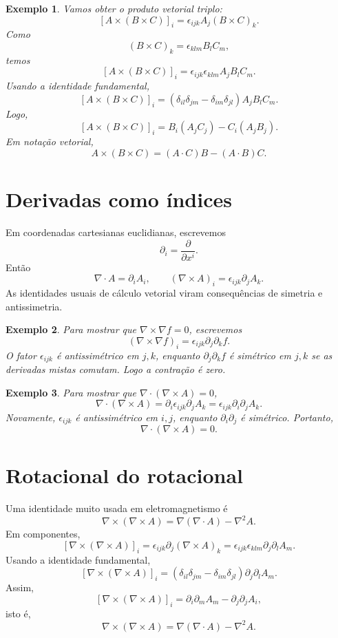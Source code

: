 \documentclass[12pt,a4paper,oneside]{book}
\theoremstyle{rgplain}
\newtheorem{example}{Exemplo}[chapter]
\theoremstyle{rgremark}
\begin{document}
\begin{example}
Vamos obter o produto vetorial triplo:
\[
  [A\times(B\times C)]_i
  =
  \epsilon_{ijk}A_j(B\times C)_k.
\]
Como
\[
  (B\times C)_k=\epsilon_{klm}B_lC_m,
\]
temos
\[
  [A\times(B\times C)]_i
  =
  \epsilon_{ijk}\epsilon_{klm}A_jB_lC_m.
\]
Usando a identidade fundamental,
\[
  [A\times(B\times C)]_i
  =
  (\delta_{il}\delta_{jm}-\delta_{im}\delta_{jl})A_jB_lC_m.
\]
Logo,
\[
  [A\times(B\times C)]_i
  =
  B_i(A_jC_j)-C_i(A_jB_j).
\]
Em notação vetorial,
\[
  A\times(B\times C)=(A\cdot C)B-(A\cdot B)C.
\]
\end{example}

\section{Derivadas como índices}

Em coordenadas cartesianas euclidianas, escrevemos
\[
  \partial_i=\frac{\partial}{\partial x^i}.
\]
Então
\[
  \nabla\cdot A=\partial_iA_i,
  \qquad
  (\nabla\times A)_i=\epsilon_{ijk}\partial_jA_k.
\]
As identidades usuais de cálculo vetorial viram consequências de simetria e
antissimetria.

\begin{example}
Para mostrar que $\nabla\times\nabla f=0$, escrevemos
\[
  (\nabla\times\nabla f)_i
  =
  \epsilon_{ijk}\partial_j\partial_k f.
\]
O fator $\epsilon_{ijk}$ é antissimétrico em $j,k$, enquanto
$\partial_j\partial_k f$ é simétrico em $j,k$ se as derivadas mistas comutam.
Logo a contração é zero.
\end{example}

\begin{example}
Para mostrar que $\nabla\cdot(\nabla\times A)=0$,
\[
  \nabla\cdot(\nabla\times A)
  =
  \partial_i\epsilon_{ijk}\partial_jA_k
  =
  \epsilon_{ijk}\partial_i\partial_jA_k.
\]
Novamente, $\epsilon_{ijk}$ é antissimétrico em $i,j$, enquanto
$\partial_i\partial_j$ é simétrico. Portanto,
\[
  \nabla\cdot(\nabla\times A)=0.
\]
\end{example}

\section{Rotacional do rotacional}

Uma identidade muito usada em eletromagnetismo é
\[
  \nabla\times(\nabla\times A)=\nabla(\nabla\cdot A)-\nabla^2A.
\]
Em componentes,
\[
  [\nabla\times(\nabla\times A)]_i
  =
  \epsilon_{ijk}\partial_j(\nabla\times A)_k
  =
  \epsilon_{ijk}\epsilon_{klm}\partial_j\partial_l A_m.
\]
Usando a identidade fundamental,
\[
  [\nabla\times(\nabla\times A)]_i
  =
  (\delta_{il}\delta_{jm}-\delta_{im}\delta_{jl})
  \partial_j\partial_l A_m.
\]
Assim,
\[
  [\nabla\times(\nabla\times A)]_i
  =
  \partial_i\partial_mA_m-\partial_j\partial_jA_i,
\]
isto é,
\[
  \nabla\times(\nabla\times A)=\nabla(\nabla\cdot A)-\nabla^2A.
\]
\end{document}
